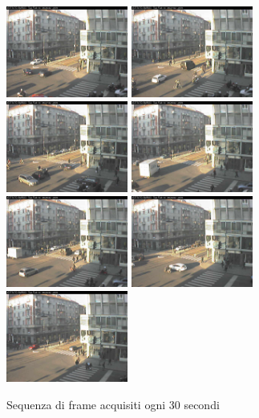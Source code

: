 \begin{figure}
	\includegraphics[width = 4cm]{./pictures/FPSbasso/image2696}
	\includegraphics[width = 4cm]{./pictures/FPSbasso/image2697}
	\includegraphics[width = 4cm]{./pictures/FPSbasso/image2698}
	\includegraphics[width = 4cm]{./pictures/FPSbasso/image2699}
	\includegraphics[width = 4cm]{./pictures/FPSbasso/image2700}
	\includegraphics[width = 4cm]{./pictures/FPSbasso/image2701}
	\includegraphics[width = 4cm]{./pictures/FPSbasso/image2702}
	\caption{Sequenza di frame acquisiti ogni 30 secondi}
	\label{fig:acquisizioneBassa}
\end{figure}
